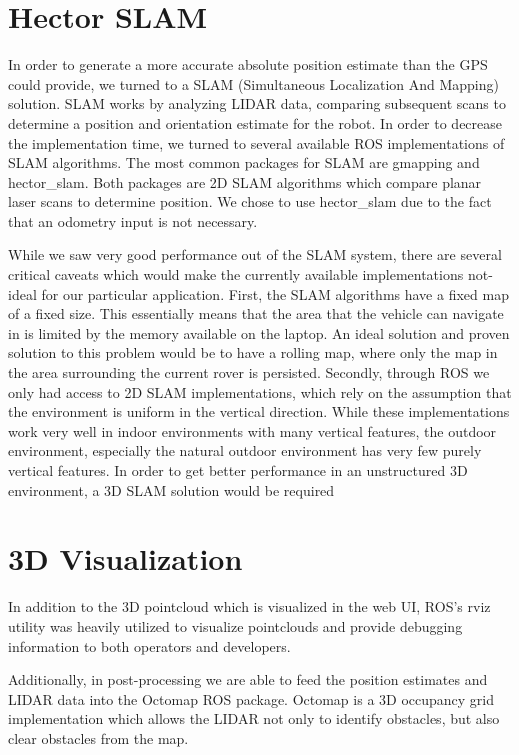 \section{Hector SLAM}


In order to generate a more accurate absolute position estimate than the GPS could provide, we turned to a SLAM (Simultaneous Localization And Mapping) solution. SLAM works by analyzing LIDAR data, comparing subsequent scans to determine a position and orientation estimate for the robot. In order to decrease the implementation time, we turned to several available ROS implementations of SLAM algorithms. The most common packages for SLAM are gmapping and hector\_slam. Both packages are 2D SLAM algorithms which compare planar laser scans to determine position. We chose to use hector\_slam due to the fact that an odometry input is not necessary.  

While we saw very good performance out of the SLAM system, there are several critical caveats which would make the currently available implementations not-ideal for our particular application. First, the SLAM algorithms have a fixed map of a fixed size. This essentially means that the area that the vehicle can navigate in is limited by the memory available on the laptop. An ideal solution and proven solution to this problem would be to have a rolling map, where only the map in the area surrounding the current rover is persisted. Secondly, through ROS we only had access to 2D SLAM implementations, which rely on the assumption that the environment is uniform in the vertical direction. While these implementations work very well in indoor environments with many vertical features, the outdoor environment, especially the natural outdoor environment has very few purely vertical features. In order to get better performance in an unstructured 3D environment, a 3D SLAM solution would be required

\section{3D Visualization}


In addition to the 3D pointcloud which is visualized in the web UI, ROS's rviz utility was heavily utilized to visualize pointclouds and provide debugging information to both operators and developers. 


Additionally, in post-processing we are able to feed the position estimates and LIDAR data into the Octomap ROS package. Octomap is a 3D occupancy grid implementation which allows the LIDAR not only to identify obstacles, but also clear obstacles from the map.

